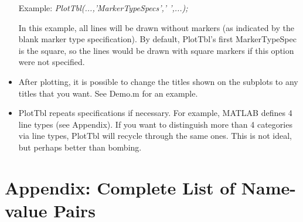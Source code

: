 \documentclass{article}
\newcommand{\example}[1]{Example: {\it #1}}
\begin{document}
\begin{itemize}
\example{PlotTbl(...,'MarkerTypeSpecs',' ',...);} 

In this example, all lines will be drawn without markers (as indicated by the blank marker type specification).
By default, PlotTbl's first MarkerTypeSpec is the square, so the lines would be drawn with square
markers if this option were not specified.

\item After plotting, it is possible to change the titles shown on the subplots to any titles that
you want.  See Demo.m for an example.

\item PlotTbl repeats specifications if necessary.  For example, MATLAB defines 4 line types (see Appendix).
If you want to distinguish more than 4 categories via line types, PlotTbl will recycle through the same ones.
This is not ideal, but perhaps better than bombing.


\end{itemize}

\appendix


\section{Appendix: Complete List of Name-value Pairs}
\end{document}
